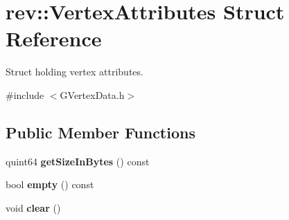 \hypertarget{structrev_1_1_vertex_attributes}{}\section{rev\+::Vertex\+Attributes Struct Reference}
\label{structrev_1_1_vertex_attributes}


Struct holding vertex attributes.  




{\ttfamily \#include $<$G\+Vertex\+Data.\+h$>$}

\subsection*{Public Member Functions}
\begin{DoxyCompactItemize}
\item 
\mbox{\label{structrev_1_1_vertex_attributes_a4bb41e23daf0767cd8c4993deca94439}} 
quint64 {\bfseries get\+Size\+In\+Bytes} () const
\item 
\mbox{\label{structrev_1_1_vertex_attributes_a533058561cfdc9785b68c0e4a9da35b9}} 
bool {\bfseries empty} () const
\item 
\mbox{\label{structrev_1_1_vertex_attributes_a28cbf4cf14e26e6768cd4e3c7a6f1fe6}} 
void {\bfseries clear} ()
\end{DoxyCompactItemize}
